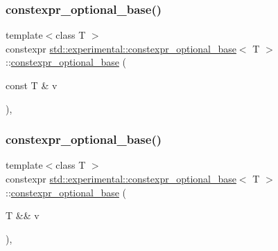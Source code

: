 \subsubsection{\texorpdfstring{constexpr\+\_\+optional\+\_\+base()}{constexpr\_optional\_base()}\hspace{0.1cm}{\footnotesize\ttfamily [2/5]}}
{\footnotesize\ttfamily template$<$class T $>$ \\
constexpr \hyperlink{structstd_1_1experimental_1_1constexpr__optional__base}{std\+::experimental\+::constexpr\+\_\+optional\+\_\+base}$<$ T $>$\+::\hyperlink{structstd_1_1experimental_1_1constexpr__optional__base}{constexpr\+\_\+optional\+\_\+base} (\begin{DoxyParamCaption}\item[{const T \&}]{v }\end{DoxyParamCaption})\hspace{0.3cm}{\ttfamily [inline]}, {\ttfamily [explicit]}}

\mbox{\label{structstd_1_1experimental_1_1constexpr__optional__base_a7a1c2735a3d7c86bdd4e179f9e291444}} 
\subsubsection{\texorpdfstring{constexpr\+\_\+optional\+\_\+base()}{constexpr\_optional\_base()}\hspace{0.1cm}{\footnotesize\ttfamily [3/5]}}
{\footnotesize\ttfamily template$<$class T $>$ \\
constexpr \hyperlink{structstd_1_1experimental_1_1constexpr__optional__base}{std\+::experimental\+::constexpr\+\_\+optional\+\_\+base}$<$ T $>$\+::\hyperlink{structstd_1_1experimental_1_1constexpr__optional__base}{constexpr\+\_\+optional\+\_\+base} (\begin{DoxyParamCaption}\item[{T \&\&}]{v }\end{DoxyParamCaption})\hspace{0.3cm}{\ttfamily [inline]}, {\ttfamily [explicit]}}

